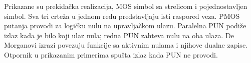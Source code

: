 Prikazane su prekidačka realizacija, MOS simbol sa strelicom i pojednostavljen simbol. Sva tri crteža u jednom redu predstavljaju isti raspored veza. PMOS putanja provodi za logičku nulu na upravljačkom ulazu. Paralelna PUN podiže izlaz kada je bilo koji ulaz nula; redna PUN zahteva nulu na oba ulaza. De Morganovi izrazi povezuju funkcije sa aktivnim nulama i njihove dualne zapise. Otpornik u prikazanim primerima spušta izlaz kada PUN ne provodi.

